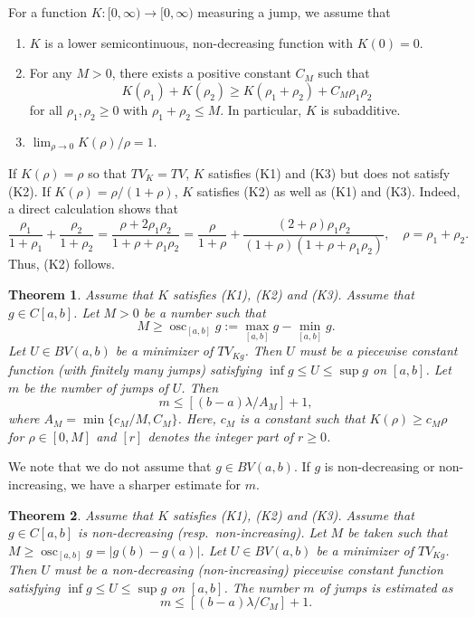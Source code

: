 \documentclass[11pt]{amsart} %
\numberwithin{equation}{section}
\newtheorem{thm}{Theorem}[section]
\begin{document}
For a function  $K\colon[0,\infty)\rightarrow[0,\infty)$   measuring a jump, we assume that
%
\begin{enumerate}
\item[(K1)]  $K$  is a lower semicontinuous, non-decreasing function with $K(0)=0$.
\item[(K2)] For any $M>0$, there exists a positive constant $C_M$ such that 
\[
	K(\rho_1) + K(\rho_2) \geq K(\rho_1+\rho_2) + C_M \rho_1 \rho_2
\]
for all $\rho_1,\rho_2\geq0$ with $\rho_1+\rho_2\leq M$.
 In particular, $K$ is subadditive.
\item[(K3)] $\lim_{\rho\to0} K(\rho)/\rho=1$.
\end{enumerate}
If $K(\rho)=\rho$ so that $TV_K=TV$, $K$ satisfies (K1) and (K3) but does not satisfy (K2).
 If $K(\rho)=\rho/(1+\rho)$, $K$ satisfies (K2) as well as (K1) and (K3).
 Indeed, a direct calculation shows that
\[
	\frac{\rho_1}{1+\rho_1} + \frac{\rho_2}{1+\rho_2} 
	= \frac{\rho+2\rho_1\rho_2}{1+\rho+\rho_1\rho_2} = \frac{\rho}{1+\rho}
	+ \frac{(2+\rho)\rho_1\rho_2}{(1+\rho)(1+\rho+\rho_1\rho_2)}, 
	\quad \rho = \rho_1 + \rho_2.
\]
Thus, (K2) follows.
\begin{thm} \label{TMain}
Assume that $K$ satisfies (K1), (K2) and (K3).
 Assume that $g\in C[a,b]$.
 Let $M>0$ be a number such that
\[
	M \ge \operatorname{osc}_{[a,b]} 
	g := \max_{[a,b]} g - \min_{[a,b]} g.
\]
Let $U\in BV(a,b)$ be a minimizer of $TV_{Kg}$.
 Then $U$ must be a piecewise constant function (with finitely many jumps) satisfying $\inf g\leq U\leq \sup g$ on $[a,b]$.
 Let $m$ be the number of jumps of $U$.
 Then
\[
	m \leq \left[ (b-a)\lambda / A_M \right] +1,
\]
where $A_M=\min\{c_M/M, C_M\}$.
 Here, $c_M$ is a constant such that $K(\rho)\geq c_M\rho$ for $\rho\in[0,M]$ and $[r]$ denotes the integer part of $r\geq0$.
\end{thm}
We note that we do not assume that $g\in BV(a,b)$.
 If $g$ is non-decreasing or non-increasing, we have a sharper estimate for $m$.
\begin{thm} \label{TMainMon}
Assume that $K$ satisfies (K1), (K2) and (K3).
 Assume that $g\in C[a,b]$ is non-decreasing (resp.\ non-increasing).
 Let $M$ be taken such that $	M\geq\operatorname{osc}_{[a,b]}g=\left|g(b)-g(a)\right|$.
 Let $U\in BV(a,b)$ be a minimizer of $TV_{Kg}$.
 Then $U$ must 
be a non-decreasing (non-increasing) piecewise constant function satisfying $\inf g\leq U\leq\sup g$ on $[a,b]$.
 The number $m$ of jumps is estimated as
\[
	m \leq \left[(b-a)\lambda/C_M \right] + 1.
\]
\end{thm}
\end{document}

